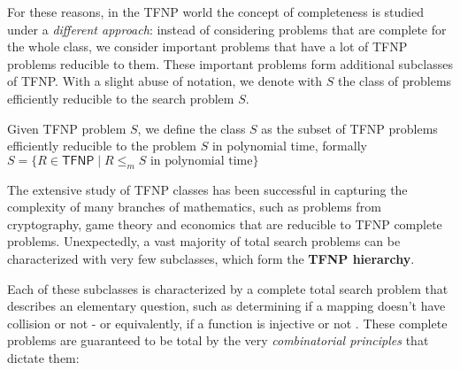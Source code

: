 For these reasons, in the \textsf{TFNP} world the concept of completeness is studied under a \textit{different approach}: instead of considering problems that are complete for the whole class, we consider important problems that have a lot of \textsf{TFNP} problems reducible to them. These important problems form additional subclasses of \textsf{TFNP}. With a slight abuse of notation, we denote with $S$ the class of problems efficiently reducible to the search problem $S$.

\begin{definition}
 Given \textsf{TFNP} problem $S$, we define the class $S$ as the subset of \textsf{TFNP} problems efficiently reducible to the problem $S$ in polynomial time, formally $S = \{R \in \mathsf{TFNP} \mid R \leq_m S \text{ in polynomial time}\}$
\end{definition}

The extensive study of \textsf{TFNP} classes has been successful in capturing the complexity of many branches of mathematics, such as problems from cryptography, game theory and economics that are reducible to TFNP complete problems. Unexpectedly, a vast majority of total search problems can be characterized with very few subclasses, which form the \textbf{\textsf{TFNP} hierarchy}. 

\newpage

Each of these subclasses is characterized by a complete total search problem that describes an elementary question, such as determining if a mapping doesn't have collision or not - or equivalently, if a function is injective or not \cite{proofs_circuits_communication,tfnp_characterization}. These complete problems are guaranteed to be total by the very \textit{combinatorial principles} that dictate them:

